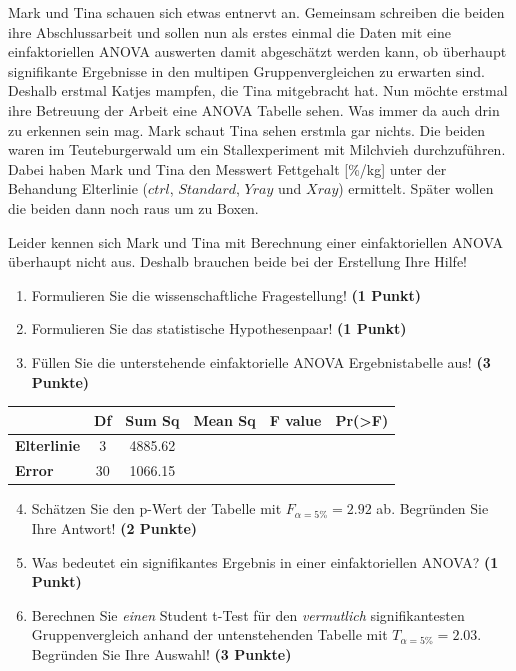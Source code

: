 \documentclass[a4paper, 9pt]{scrartcl}\usepackage[]{graphicx}\usepackage[]{xcolor}
\begin{document}
Mark und Tina schauen sich etwas entnervt an. Gemeinsam schreiben die beiden ihre Abschlussarbeit und sollen nun als erstes einmal die Daten mit eine einfaktoriellen ANOVA auswerten damit abgeschätzt werden kann, ob überhaupt signifikante Ergebnisse in den multipen Gruppenvergleichen zu erwarten sind. Deshalb erstmal Katjes mampfen, die Tina mitgebracht hat. Nun möchte erstmal ihre Betreuung der Arbeit eine ANOVA Tabelle sehen. Was immer da auch drin zu erkennen sein mag. Mark schaut Tina sehen erstmla gar nichts. Die beiden waren im Teuteburgerwald um ein Stallexperiment mit Milchvieh durchzuführen. Dabei haben Mark und Tina den Messwert Fettgehalt [\%/kg] unter der Behandung Elterlinie ($ctrl$, $Standard$, $Yray$ und $Xray$) ermittelt. Später wollen die beiden dann noch raus um zu Boxen.



\vspace{1ex}

Leider kennen sich Mark und Tina mit Berechnung einer einfaktoriellen ANOVA überhaupt nicht aus. Deshalb brauchen beide bei der Erstellung Ihre Hilfe! 

\begin{enumerate}
  \item Formulieren Sie die wissenschaftliche Fragestellung! \textbf{(1 Punkt)}
  \item Formulieren Sie das statistische Hypothesenpaar! \textbf{(1 Punkt)}
\item Füllen Sie die unterstehende einfaktorielle ANOVA Ergebnistabelle aus! \textbf{(3 Punkte)}
\end{enumerate}

\vspace{1Ex}

\begin{center}
  \Large
  \begin{tabular}{lccccp{3cm}}
\toprule
     & \textbf{Df} & \textbf{Sum Sq} & \textbf{Mean Sq} & \textbf{F value} & \textbf{Pr(>F)} \strut\\
    \midrule
   \textbf{Elterlinie}  & 3 & 4885.62 &  &  &  \strut\\
   \textbf{Error}  & 30 & 1066.15 &  &  &  \strut\\
\bottomrule
  \end{tabular}
\end{center}

\vspace{1Ex}

\begin{enumerate}
  \setcounter{enumi}{3}
\item Schätzen Sie den p-Wert der Tabelle mit $F_{\alpha = 5\%} = 2.92$ ab. Begründen Sie Ihre Antwort! \textbf{(2 Punkte)}
\item Was bedeutet ein signifikantes Ergebnis in einer einfaktoriellen ANOVA? \textbf{(1 Punkt)}
\item Berechnen Sie \textit{einen} Student t-Test für den \textit{vermutlich} signifikantesten Gruppenvergleich anhand der untenstehenden Tabelle mit $T_{\alpha = 5\%} = 2.03$. Begründen Sie Ihre Auswahl! \textbf{(3 Punkte)}
\end{enumerate}
\end{document}
